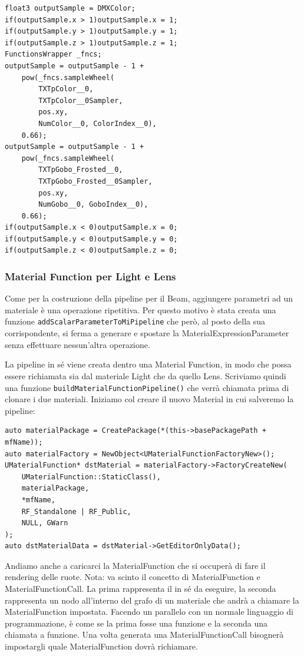 \documentclass[main.tex]{subfiles}
\begin{document}
\lstset{language=glsl}
\begin{lstlisting}
float3 outputSample = DMXColor;
if(outputSample.x > 1)outputSample.x = 1;
if(outputSample.y > 1)outputSample.y = 1;
if(outputSample.z > 1)outputSample.z = 1;
FunctionsWrapper _fncs;
outputSample = outputSample - 1 +
    pow(_fncs.sampleWheel(
        TXTpColor__0,
        TXTpColor__0Sampler,
        pos.xy,
        NumColor__0, ColorIndex__0),
    0.66);
outputSample = outputSample - 1 +
    pow(_fncs.sampleWheel(
        TXTpGobo_Frosted__0,
        TXTpGobo_Frosted__0Sampler,
        pos.xy,
        NumGobo__0, GoboIndex__0),
    0.66);
if(outputSample.x < 0)outputSample.x = 0;
if(outputSample.y < 0)outputSample.y = 0;
if(outputSample.z < 0)outputSample.z = 0;
\end{lstlisting}
\clearpage %

\subsubsection{Material Function per Light e Lens}\label{subsec:2_3_MF}
Come per la costruzione della pipeline per il Beam, aggiungere parametri ad un materiale è una operazione ripetitiva. Per questo motivo è stata creata una funzione \lstinline{addScalarParameterToMiPipeline} che però, al posto della sua corrispondente, si ferma a generare e spostare la MaterialExpressionParameter senza effettuare nessun'altra operazione. \newline

La pipeline in sé viene creata dentro una Material Function, in modo che possa essere richiamata sia dal materiale Light che da quello Lens. Scriviamo quindi una funzione \lstinline{buildMaterialFunctionPipeline()} che verrà chiamata prima di clonare i due materiali. Iniziamo col creare il nuovo Material in cui salveremo la pipeline:
\lstset{language=UEcpp}
\begin{lstlisting}
auto materialPackage = CreatePackage(*(this->basePackagePath + mfName));
auto materialFactory = NewObject<UMaterialFunctionFactoryNew>();
UMaterialFunction* dstMaterial = materialFactory->FactoryCreateNew(
    UMaterialFunction::StaticClass(),
    materialPackage,
    *mfName,
    RF_Standalone | RF_Public,
    NULL, GWarn
);
auto dstMaterialData = dstMaterial->GetEditorOnlyData();
\end{lstlisting}
Andiamo anche a caricarci la MaterialFunction che si occuperà di fare il rendering delle ruote. Nota: va scinto il concetto di MaterialFunction e MaterialFunctionCall. La prima rappresenta il  in sé da eseguire, la seconda rappresenta un nodo all'interno del grafo di un materiale che andrà a chiamare la MaterialFunction impostata. Facendo un parallelo con un normale linguaggio di programmazione, è come se la prima fosse una funzione e la seconda una chiamata a funzione. Una volta generata una MaterialFunctionCall bisognerà impostargli quale MaterialFunction dovrà richiamare.
\end{document}
